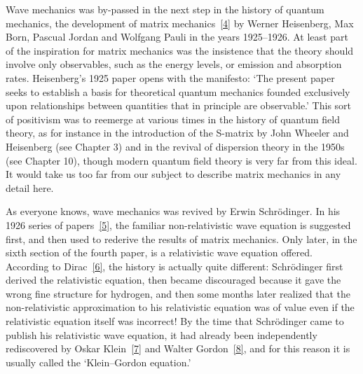 Wave mechanics was by-passed in the next step in the history of
quantum mechanics, the development of matrix mechanics~\hyperref[ref:1.4]{[4]} by Werner
Heisenberg, Max Born, Pascual Jordan and Wolfgang Pauli in the years
1925--1926. At least part of the inspiration for matrix mechanics was the
insistence that the theory should involve only observables, such as the
energy levels, or emission and absorption rates. Heisenberg's 1925 paper
opens with the manifesto: `The present paper seeks to establish a basis
for theoretical quantum mechanics founded exclusively upon relationships
between quantities that in principle are observable.' This sort of positivism
was to reemerge at various times in the history of quantum field theory,
as for instance in the introduction of the S-matrix by John Wheeler and
Heisenberg (see Chapter 3) and in the revival of dispersion theory in the
1950s (see Chapter 10), though modern quantum field theory is very far
from this ideal. It would take us too far from our subject to describe
matrix mechanics in any detail here.

As everyone knows, wave mechanics was revived by Erwin Schr\"odinger.
In his 1926 series of papers~\hyperref[ref:1.5]{[5]}, the familiar non-relativistic wave equation
is suggested first, and then used to rederive the results of matrix mechanics.
Only later, in the sixth section of the fourth paper, is a relativistic
wave equation offered. According to Dirac~\hyperref[ref:1.6]{[6]}, the history is actually quite
different: Schr\"odinger first derived the relativistic equation, then became
discouraged because it gave the wrong fine structure for hydrogen, and
then some months later realized that the non-relativistic approximation
to his relativistic equation was of value even if the relativistic equation
itself was incorrect! By the time that Schr\"odinger came to publish his
relativistic wave equation, it had already been independently rediscovered
by Oskar Klein~\hyperref[ref:1.7]{[7]} and Walter Gordon~\hyperref[ref:1.8]{[8]}, and for this reason it is usually
called the `Klein--Gordon equation.'

